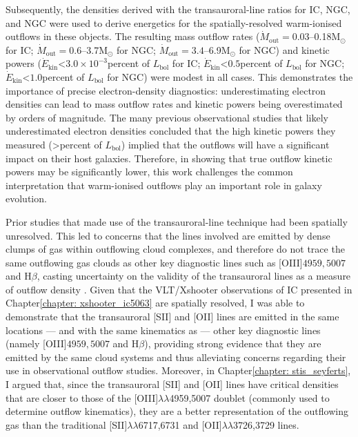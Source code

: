 Subsequently, the densities derived with the transauroral-line ratios for IC, NGC, and NGC were used to derive energetics for the spatially-resolved warm-ionised outflows in these objects. The resulting mass outflow rates ($\dot{M}_\mathrm{out}=0.03$--0.18\;M$_\odot$ for IC; $\dot{M}_\mathrm{out}=0.6$--3.7\;M$_\odot$ for NGC; $\dot{M}_\mathrm{out}=3.4$--6.9\;M$_\odot$ for NGC) and kinetic powers ($\dot{E}_\mathrm{kin}$\;\textless\;$3.0\times10^{-3}$\;per\;cent of $L_\mathrm{bol}$ for IC; $\dot{E}_\mathrm{kin}$\;\textless\;$0.5$\;per\;cent of $L_\mathrm{bol}$ for NGC; $\dot{E}_\mathrm{kin}$\;\textless\;$1.0$\;per\;cent of $L_\mathrm{bol}$ for NGC) were modest in all cases. This demonstrates the importance of precise electron-density diagnostics: underestimating electron densities can lead to mass outflow rates and kinetic powers being overestimated by orders of magnitude. The many previous observational studies that likely underestimated electron densities concluded that the high kinetic powers they measured (\;\textgreater{}\;per\;cent\; of $L_\mathrm{bol}$) implied that the outflows will have a significant impact on their host galaxies. Therefore, in showing that true outflow kinetic powers may be significantly lower, this work challenges the common interpretation that warm-ionised outflows play an important role in galaxy evolution.

Prior studies that made use of the transauroral-line technique had been spatially unresolved. This led to concerns that the lines involved are emitted by dense clumps of gas within outflowing cloud complexes, and therefore do not trace the same outflowing gas clouds as other key diagnostic lines such as [OIII]$4959,5007$ and H$\beta$, casting uncertainty on the validity of the transauroral lines as a measure of outflow density \citep{Sun2017, Rose2018, Spence2018}. Given that the VLT/Xshooter observations of IC presented in Chapter\;\ref{chapter: xshooter_ic5063} are spatially resolved, I was able to demonstrate that the transauroral [SII] and [OII] lines are emitted in the same locations --- and with the same kinematics as --- other key diagnostic lines (namely [OIII]$4959,5007$ and H$\beta$), providing strong evidence that they are emitted by the same cloud systems and thus alleviating concerns regarding their use in observational outflow studies. Moreover, in Chapter\;\ref{chapter: stis_seyferts}, I argued that, since the transauroral [SII] and [OII] lines have critical densities that are closer to those of the [OIII]$\lambda\lambda$4959,5007 doublet (commonly used to determine outflow kinematics), they are a better representation of the outflowing gas than the traditional [SII]$\lambda\lambda$6717,6731 and [OII]$\lambda\lambda$3726,3729 lines.

